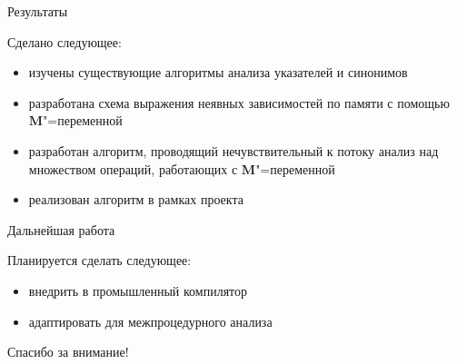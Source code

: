 \documentclass[usenames,dvipsnames,pdftex,unicode,hidelinks]{beamer}
\newcommand{\M}{\ensuremath{\mathbf{M}}}
\begin{document}
\begin{frame}{Результаты}

  Сделано следующее:
  \begin{itemize}
    \item изучены существующие алгоритмы анализа указателей и синонимов
    \item разработана схема выражения неявных зависимостей по памяти с помощью
          \M"=переменной
    \item разработан алгоритм, проводящий нечувствительный к потоку анализ над
          множеством операций, работающих с \M"=переменной
    \item реализован алгоритм в рамках проекта 
  \end{itemize}

\end{frame}

\begin{frame}{Дальнейшая работа}

  Планируется сделать следующее:
  \begin{itemize}
    \item внедрить в промышленный компилятор 
    \item адаптировать для межпроцедурного анализа
  \end{itemize}

\end{frame}

\begin{frame}

  \centerline{\huge Спасибо за внимание!}

\end{frame}
\end{document}

